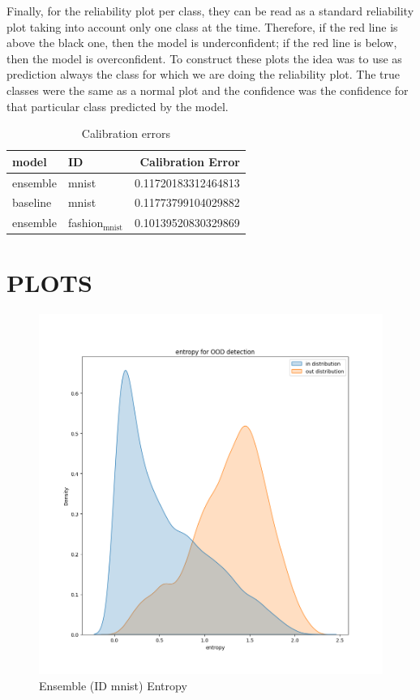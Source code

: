 \documentclass[11pt]{article}
\begin{document}
Finally, for the reliability plot per class, they can be read as a
standard reliability plot taking into account only one class at the
time. Therefore, if the red line is above the black one, then the model
is underconfident; if the red line is below, then the model is overconfident.
To construct these plots the idea was to use as prediction always the
class for which we are doing the reliability plot. The true classes
were the same as a normal plot and the confidence was the confidence
for that particular class predicted by the model.
\begin{table}[htbp]
\caption{\label{tab:org7184784}
Calibration errors}
\centering
\begin{tabular}{llr}
\hline
model & ID & Calibration Error\\
\hline
ensemble & mnist & 0.11720183312464813\\
\hline
baseline & mnist & 0.11773799104029882\\
\hline
ensemble & fashion\(_{\text{mnist}}\) & 0.10139520830329869\\
\hline
\end{tabular}
\end{table}


\section{PLOTS}
\label{sec:orgad650ec}
\begin{figure}[htbp]
\centering
\includegraphics[width=.9\linewidth]{./ens_mnist_entropy.png}
\caption{\label{fig:org62b3204}
Ensemble (ID mnist) Entropy}
\end{figure}
\end{document}
